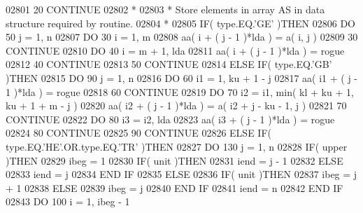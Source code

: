 \begin{DoxyCode}
02801    20 \textcolor{keywordflow}{CONTINUE}
02802 \textcolor{comment}{*}
02803 \textcolor{comment}{*     Store elements in array AS in data structure required by routine.}
02804 \textcolor{comment}{*}
02805       \textcolor{keywordflow}{IF}( type.EQ.\textcolor{stringliteral}{'GE'} )\textcolor{keywordflow}{THEN}
02806          \textcolor{keywordflow}{DO} 50 j = 1, n
02807             \textcolor{keywordflow}{DO} 30 i = 1, m
02808                aa( i + ( j - 1 )*lda ) = a( i, j )
02809    30       \textcolor{keywordflow}{CONTINUE}
02810             \textcolor{keywordflow}{DO} 40 i = m + 1, lda
02811                aa( i + ( j - 1 )*lda ) = rogue
02812    40       \textcolor{keywordflow}{CONTINUE}
02813    50    \textcolor{keywordflow}{CONTINUE}
02814       \textcolor{keywordflow}{ELSE} \textcolor{keywordflow}{IF}( type.EQ.\textcolor{stringliteral}{'GB'} )\textcolor{keywordflow}{THEN}
02815          \textcolor{keywordflow}{DO} 90 j = 1, n
02816             \textcolor{keywordflow}{DO} 60 i1 = 1, ku + 1 - j
02817                aa( i1 + ( j - 1 )*lda ) = rogue
02818    60       \textcolor{keywordflow}{CONTINUE}
02819             \textcolor{keywordflow}{DO} 70 i2 = i1, min( kl + ku + 1, ku + 1 + m - j )
02820                aa( i2 + ( j - 1 )*lda ) = a( i2 + j - ku - 1, j )
02821    70       \textcolor{keywordflow}{CONTINUE}
02822             \textcolor{keywordflow}{DO} 80 i3 = i2, lda
02823                aa( i3 + ( j - 1 )*lda ) = rogue
02824    80       \textcolor{keywordflow}{CONTINUE}
02825    90    \textcolor{keywordflow}{CONTINUE}
02826       \textcolor{keywordflow}{ELSE} \textcolor{keywordflow}{IF}( type.EQ.\textcolor{stringliteral}{'HE'}.OR.type.EQ.\textcolor{stringliteral}{'TR'} )\textcolor{keywordflow}{THEN}
02827          \textcolor{keywordflow}{DO} 130 j = 1, n
02828             \textcolor{keywordflow}{IF}( upper )\textcolor{keywordflow}{THEN}
02829                ibeg = 1
02830                \textcolor{keywordflow}{IF}( unit )\textcolor{keywordflow}{THEN}
02831                   iend = j - 1
02832                \textcolor{keywordflow}{ELSE}
02833                   iend = j
02834 \textcolor{keywordflow}{               END IF}
02835             \textcolor{keywordflow}{ELSE}
02836                \textcolor{keywordflow}{IF}( unit )\textcolor{keywordflow}{THEN}
02837                   ibeg = j + 1
02838                \textcolor{keywordflow}{ELSE}
02839                   ibeg = j
02840 \textcolor{keywordflow}{               END IF}
02841                iend = n
02842 \textcolor{keywordflow}{            END IF}
02843             \textcolor{keywordflow}{DO} 100 i = 1, ibeg - 1

\end{DoxyCode}
